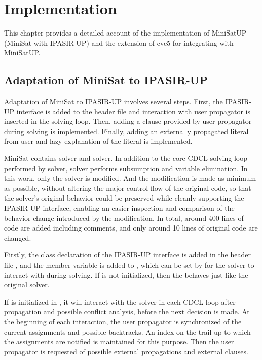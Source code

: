 \chapter{Implementation}

This chapter provides a detailed account of the implementation of MiniSatUP (MiniSat with IPASIR-UP) and the extension of cvc5 for integrating with MiniSatUP.

\section{Adaptation of MiniSat to IPASIR-UP}

Adaptation of MiniSat to IPASIR-UP involves several steps. First, the IPASIR-UP interface is added to the header file and interaction with user propagator is inserted in the solving loop. Then, adding a clause provided by user propagator during solving is implemented. Finally, adding an externally propagated literal from user and lazy explanation of the literal is implemented.

MiniSat contains  solver and  solver. In addition to the core CDCL solving loop performed by  solver,  solver performs subsumption and variable elimination. In this work, only the  solver is modified. And the modification is made as minimum as possible, without altering the major control flow of the original code, so that the solver's original behavior could be preserved while cleanly supporting the IPASIR-UP interface, enabling an easier inspection and comparison of the behavior change introduced by the modification. In total, around 400 lines of code are added including comments, and only around 10 lines of original code are changed.

Firstly, the  class declaration of the IPASIR-UP interface is added in the header file , and the  member variable is added to , which can be set by  for the solver to interact with during solving. If  is not initialized, then the  behaves just like the original solver.

If  is initialized in , it will interact with the solver in each CDCL loop after propagation and possible conflict analysis, before the next decision is made. At the beginning of each interaction, the user propagator is synchronized of the current assignments and possible backtracks. An index on the trail up to which the assignments are notified is maintained for this purpose. Then the user propagator is requested of possible external propagations and external clauses.

